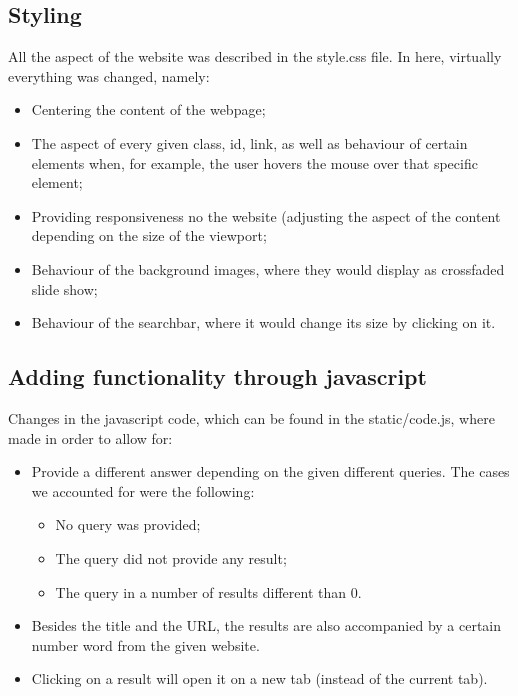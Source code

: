 \subsection{Styling}
All the aspect of the website was described in the style.css file. In here, virtually everything was changed, namely:
\begin{itemize}
    \item Centering the content of the webpage;
    \item The aspect of every given class, id, link, as well as behaviour of certain elements when, for example, the user hovers the mouse over that specific element;
    \item Providing responsiveness no the website (adjusting the aspect of the content depending on the size of the viewport;
    \item Behaviour of the background images, where they would display as crossfaded slide show;
    \item Behaviour of the searchbar, where it would change its size by clicking on it.
\end{itemize}

\subsection{Adding functionality through javascript}
Changes in the javascript code, which can be found in the static/code.js, where made in order to allow for:
\begin{itemize}
    \item Provide a different answer depending on the given different queries. The cases we accounted for were the following:
    \begin{itemize}
        \item No query was provided;
        \item The query did not provide any result;
        \item The query in a number of results different than $0$.
    \end{itemize}
    \item Besides the title and the URL, the results are also accompanied by a certain number word from the given website.
    \item Clicking on a result will open it on a new tab (instead of the current tab).
\end{itemize}